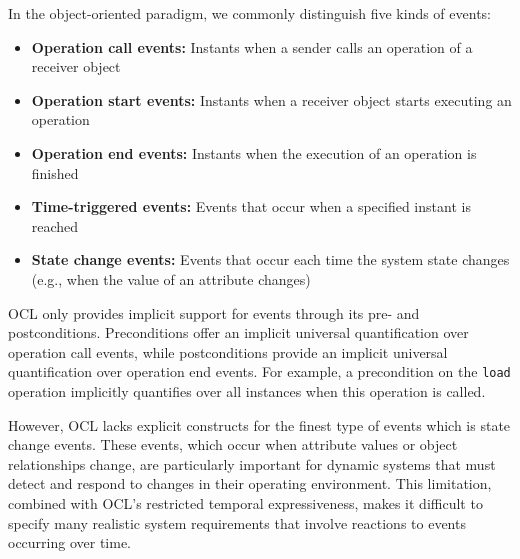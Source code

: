In the object-oriented paradigm, we commonly distinguish five kinds of events: 
\begin{itemize} 
    \item \textbf{Operation call events:} Instants when a sender calls an operation of a receiver object 
    \item \textbf{Operation start events:} Instants when a receiver object starts executing an operation 
    \item \textbf{Operation end events:} Instants when the execution of an operation is finished 
    \item \textbf{Time-triggered events:} Events that occur when a specified instant is reached 
    \item \textbf{State change events:} Events that occur each time the system state changes (e.g., when the value of an attribute changes) 
\end{itemize}

OCL only provides implicit support for events through its pre- and postconditions. 
Preconditions offer an implicit universal quantification over operation call events, 
while postconditions provide an implicit universal quantification over operation end 
events. For example, a precondition on the \texttt{load} operation implicitly 
quantifies over all instances when this operation is called.

However, OCL lacks explicit constructs for the finest type of events which is state change 
events. These events, which occur when attribute values or object relationships 
change, are particularly important for dynamic systems that must detect and 
respond to changes in their operating environment. This limitation, combined with OCL's restricted temporal 
expressiveness, makes it difficult to specify many realistic system requirements 
that involve reactions to events occurring over time.

